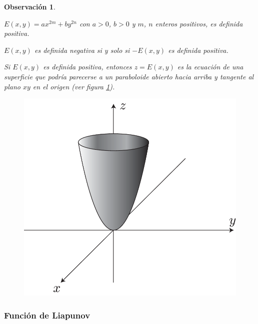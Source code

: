 \documentclass[a5paper,doc,10pt,noapacite]{apa6}
\newtheorem{observ}{Observación}
\begin{document}
{{\begin{observ}\quad
	\begin{APAitemize}
		\item \(E(x,y)=ax^{2m} + by^{2n}\) con \(a>0\), \(b>0\) y \(m\), \(n\) enteros positivos, es definida positiva.
		\item \(E(x,y)\) es definida negativa si y solo si \(-E(x,y)\) es definida positiva.
		\item Si \(E(x,y)\) es definida positiva, entonces \(z=E(x,y)\) es la ecuación de una superficie que podría parecerse a un paraboloide abierto hacia arriba y tangente al plano \(xy\) en el origen (ver figura \ref{fig:M-18}).
		\vspace{-1\baselineskip}
	\begin{figure}[H]
		\captionsetup{justification=centering, labelfont=footnotesize, font=footnotesize}
		\centering
		\includegraphics[scale=0.35]{Graficos/figura18}
	
		\caption{ }
		\label{fig:M-18}
	\end{figure}	\end{APAitemize}
\end{observ}


\subsubsection{Función de Liapunov}

}}
\end{document}
